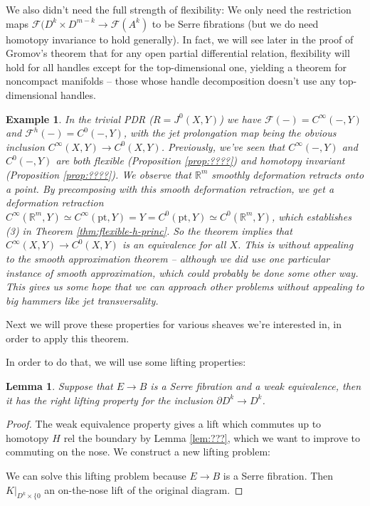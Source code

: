 \documentclass{article}
\newtheorem{lemma}[theorem]{Lemma}
\newtheorem{example}[theorem]{Example}
\newtheorem{proposed work}[theorem]{Proposed Work}
\begin{document}
We also didn't need the full strength of flexibility: We only need the restriction maps $\mathcal F(D^k \times D^{m-k} \to \mathcal F(A^k)$ to be Serre fibrations (but we do need homotopy invariance to hold generally). In fact, we will see later in the proof of Gromov's theorem that for any open partial differential relation, flexibility will hold for all handles except for the top-dimensional one, yielding a theorem for noncompact manifolds -- those whose handle decomposition doesn't use any top-dimensional handles.

\begin{example}
In the trivial PDR ($R = J^0(X,Y)$) we have $\mathcal F(-) = C^\infty(-,Y)$ and $\mathcal F^h(-) = C^0(-,Y)$, with the jet prolongation map being the obvious inclusion $C^\infty(X,Y) \to C^0(X,Y)$. Previously, we've seen that $C^\infty(-,Y)$ and $C^0(-,Y)$ are both flexible (Proposition \ref{prop:????}) and homotopy invariant (Proposition \ref{prop:????}). We observe that $\mathbb R^m$ smoothly deformation retracts onto a point. By precomposing with this smooth deformation retraction, we get a deformation retraction $C^\infty(\mathbb R^m, Y) \simeq C^\infty(\mathrm{pt},Y) = Y = C^0(\mathrm{pt},Y) \simeq C^0(\mathbb R^m,Y)$, which establishes (3) in Theorem \ref{thm:flexible-h-princ}. So the theorem implies that $C^\infty(X,Y) \to C^0(X,Y)$ is an equivalence for all $X$. This is without appealing to the smooth approximation theorem -- although we did use one particular instance of smooth approximation, which could probably be done some other way. This gives us some hope that we can approach other problems without appealing to big hammers like jet transversality.
\end{example}

Next we will prove these properties for various sheaves we're interested in, in order to apply this theorem.

In order to do that, we will use some lifting properties:

\begin{lemma}
Suppose that $E \to B$ is a Serre fibration and a weak equivalence, then it has the right lifting property for the inclusion $\partial D^k \to D^k$.
\end{lemma}
\begin{proof}
The weak equivalence property gives a lift which commutes up to homotopy $H$ rel the boundary by Lemma \ref{lem:???}, which we want to improve to commuting on the nose. We construct a new lifting problem:


We can solve this lifting problem because $E \to B$ is a Serre fibration. Then $K|_{D^k \times \{0}$ an on-the-nose lift of the original diagram.
\end{proof}




\printbibliography
\end{document}
